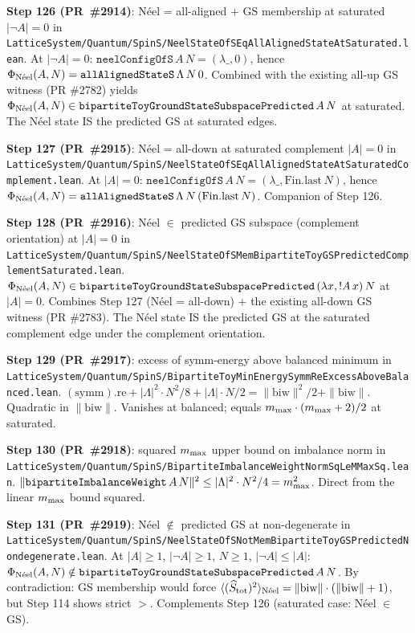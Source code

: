 \documentclass[a4paper,11pt]{article}
\begin{document}
\textbf{Step 126 (PR~\#2914)}: N\'eel = all-aligned + GS membership
at saturated $|\neg A| = 0$ in
\texttt{LatticeSystem/Quantum/SpinS/NeelStateOfSEqAllAlignedStateAtSaturated.lean}.
At $|\neg A| = 0$:
$\mathtt{neelConfigOfS}\,A\,N = (\lambda \_, 0)$, hence
$\Phi_{\rm N\acute{e}el}(A, N) = \mathtt{allAlignedStateS}\,\Lambda\,N\,0$.
Combined with the existing all-up GS witness (PR \#2782) yields
$\Phi_{\rm N\acute{e}el}(A, N) \in
   \mathtt{bipartiteToyGroundStateSubspacePredicted}\,A\,N$ at
saturated. The N\'eel state IS the predicted GS at saturated edges.

\textbf{Step 127 (PR~\#2915)}: N\'eel = all-down at saturated
complement $|A| = 0$ in
\texttt{LatticeSystem/Quantum/SpinS/NeelStateOfSEqAllAlignedStateAtSaturatedComplement.lean}.
At $|A| = 0$:
$\mathtt{neelConfigOfS}\,A\,N = (\lambda \_, \mathrm{Fin.last}\,N)$,
hence $\Phi_{\rm N\acute{e}el}(A, N) =
\mathtt{allAlignedStateS}\,\Lambda\,N\,(\mathrm{Fin.last}\,N)$.
Companion of Step 126.

\textbf{Step 128 (PR~\#2916)}: N\'eel $\in$ predicted GS subspace
(complement orientation) at $|A| = 0$ in
\texttt{LatticeSystem/Quantum/SpinS/NeelStateOfSMemBipartiteToyGSPredictedComplementSaturated.lean}.
$\Phi_{\rm N\acute{e}el}(A, N) \in
\mathtt{bipartiteToyGroundStateSubspacePredicted}\,(\lambda x, !A\,x)\,N$
at $|A| = 0$. Combines Step 127 (N\'eel = all-down) + the existing
all-down GS witness (PR \#2783). The N\'eel state IS the predicted
GS at the saturated complement edge under the complement
orientation.

\textbf{Step 129 (PR~\#2917)}: excess of symm-energy above balanced
minimum in
\texttt{LatticeSystem/Quantum/SpinS/BipartiteToyMinEnergySymmReExcessAboveBalanced.lean}.
$(\mathrm{symm}).\mathrm{re} + |\Lambda|^2\cdot N^2/8 + |\Lambda|\cdot N/2
   = \|\mathrm{biw}\|^2/2 + \|\mathrm{biw}\|$.
Quadratic in $\|\mathrm{biw}\|$. Vanishes at balanced; equals
$m_{\rm max}\cdot(m_{\rm max}+2)/2$ at saturated.

\textbf{Step 130 (PR~\#2918)}: squared $m_{\rm max}$ upper bound on
imbalance norm in
\texttt{LatticeSystem/Quantum/SpinS/BipartiteImbalanceWeightNormSqLeMMaxSq.lean}.
$\|\mathtt{bipartiteImbalanceWeight}\,A\,N\|^2 \le |\Lambda|^2\cdot N^2/4
= m_{\rm max}^2$. Direct from the linear $m_{\rm max}$ bound squared.

\textbf{Step 131 (PR~\#2919)}: N\'eel $\notin$ predicted GS at
non-degenerate in
\texttt{LatticeSystem/Quantum/SpinS/NeelStateOfSNotMemBipartiteToyGSPredictedNondegenerate.lean}.
At $|A| \ge 1$, $|\neg A| \ge 1$, $N \ge 1$, $|\neg A| \le |A|$:
$\Phi_{\rm N\acute{e}el}(A, N) \notin
\mathtt{bipartiteToyGroundStateSubspacePredicted}\,A\,N$. By
contradiction: GS membership would force
$\langle(\widehat S_{\rm tot})^2\rangle_{\rm N\acute{e}el} =
\|\mathrm{biw}\|\cdot(\|\mathrm{biw}\|+1)$, but Step 114 shows
strict $>$. Complements Step 126 (saturated case: N\'eel $\in$ GS).
\end{document}
